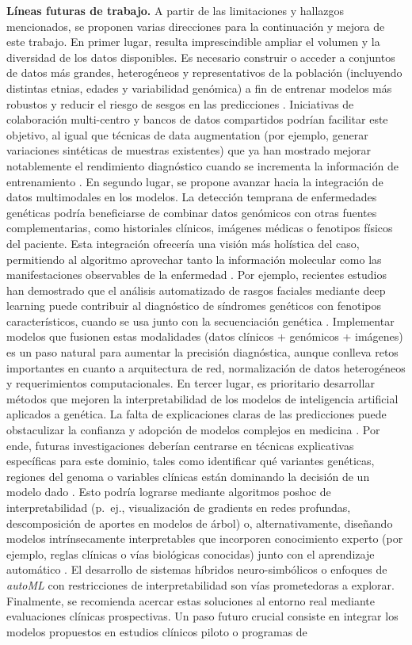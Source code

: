\documentclass[11pt,a4paper,spanish]{book}
\numberwithin{equation}{chapter}
\numberwithin{figure}{chapter}
\begin{document}
\noindent \textbf{Líneas futuras de trabajo.} A partir de las limitaciones y hallazgos mencionados, se proponen varias direcciones para la continuación y mejora de este trabajo. En primer lugar, resulta imprescindible ampliar el volumen y la diversidad de los datos disponibles. Es necesario construir o acceder a conjuntos de datos más grandes, heterogéneos y representativos de la población (incluyendo distintas etnias, edades y variabilidad genómica) a fin de entrenar modelos más robustos y reducir el riesgo de sesgos en las predicciones \cite{Libbrecht2015,Ching_2018}. Iniciativas de colaboración multi-centro y bancos de datos compartidos podrían facilitar este objetivo, al igual que técnicas de data augmentation (por ejemplo, generar variaciones sintéticas de muestras existentes) que ya han mostrado mejorar notablemente el rendimiento diagnóstico cuando se incrementa la información de entrenamiento \cite{topol2019}. En segundo lugar, se propone avanzar hacia la integración de datos multimodales en los modelos. La detección temprana de enfermedades genéticas podría beneficiarse de combinar datos genómicos con otras fuentes complementarias, como historiales clínicos, imágenes médicas o fenotipos físicos del paciente. Esta integración ofrecería una visión más holística del caso, permitiendo al algoritmo aprovechar tanto la información molecular como las manifestaciones observables de la enfermedad \cite{Ching_2018}. Por ejemplo, recientes estudios han demostrado que el análisis automatizado de rasgos faciales mediante deep learning puede contribuir al diagnóstico de síndromes genéticos con fenotipos característicos, cuando se usa junto con la secuenciación genética \cite{gurovich2019}. Implementar modelos que fusionen estas modalidades (datos clínicos + genómicos + imágenes) es un paso natural para aumentar la precisión diagnóstica, aunque conlleva retos importantes en cuanto a arquitectura de red, normalización de datos heterogéneos y requerimientos computacionales. En tercer lugar, es prioritario desarrollar métodos que mejoren la interpretabilidad de los modelos de inteligencia artificial aplicados a genética. La falta de explicaciones claras de las predicciones puede obstaculizar la confianza y adopción de modelos complejos en medicina \cite{rudin_2019}. Por ende, futuras investigaciones deberían centrarse en técnicas explicativas específicas para este dominio, tales como identificar qué variantes genéticas, regiones del genoma o variables clínicas están dominando la decisión de un modelo dado \cite{Ching_2018}. Esto podría lograrse mediante algoritmos poshoc de interpretabilidad (p.~ej., visualización de gradients en redes profundas, descomposición de aportes en modelos de árbol) o, alternativamente, diseñando modelos intrínsecamente interpretables que incorporen conocimiento experto (por ejemplo, reglas clínicas o vías biológicas conocidas) junto con el aprendizaje automático \cite{Alsentzer2025}. El desarrollo de sistemas híbridos neuro-simbólicos o enfoques de \textit{autoML} con restricciones de interpretabilidad son vías prometedoras a explorar. Finalmente, se recomienda acercar estas soluciones al entorno real mediante evaluaciones clínicas prospectivas. Un paso futuro crucial consiste en integrar los modelos propuestos en estudios clínicos piloto o programas de 
\end{document}
